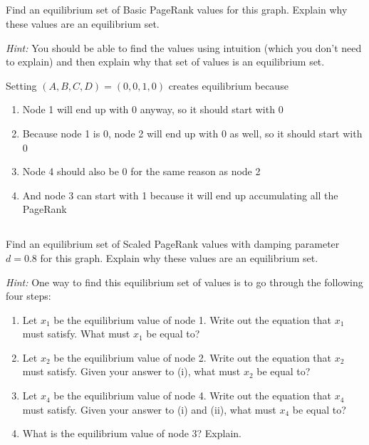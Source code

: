 \documentclass[newpages]{assignment}
\begin{document}
\subsection{}
\begin{problem}
    Find an equilibrium set of Basic PageRank values for this graph. Explain why these values are an equilibrium set.

    \textit{Hint:} You should be able to find the values using intuition (which you don't need to explain) and then explain why that set of values is an equilibrium set.
\end{problem}

Setting $(A, B, C, D) = (0, 0, 1, 0)$ creates equilibrium because

\begin{enumerate}
    \item Node 1 will end up with 0 anyway, so it should start with 0
    \item Because node 1 is 0, node 2 will end up with 0 as well, so it should start with 0
    \item Node 4 should also be 0 for the same reason as node 2
    \item And node 3 can start with 1 because it will end up accumulating all the PageRank
\end{enumerate}

\subsection{}
\begin{problem}
    Find an equilibrium set of Scaled PageRank values with damping parameter \(d=0.8\) for this graph. Explain why these values are an equilibrium set.

    \textit{Hint:} One way to find this equilibrium set of values is to go through the following four steps:
    \begin{enumerate}[label=(\roman*)]
        \item Let \(x_1\) be the equilibrium value of node 1. Write out the equation that \(x_1\) must satisfy. What must \(x_1\) be equal to?
        \item Let \(x_2\) be the equilibrium value of node 2. Write out the equation that \(x_2\) must satisfy. Given your answer to (i), what must \(x_2\) be equal to?
        \item Let \(x_4\) be the equilibrium value of node 4. Write out the equation that \(x_4\) must satisfy. Given your answer to (i) and (ii), what must \(x_4\) be equal to?
        \item What is the equilibrium value of node 3? Explain.
    \end{enumerate}
\end{problem}
\end{document}
